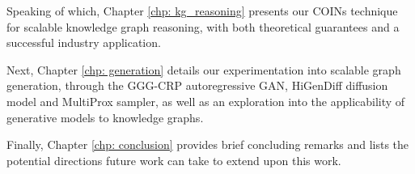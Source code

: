 Speaking of which, Chapter \ref{chp: kg_reasoning} presents our COINs technique for scalable knowledge graph reasoning, with both theoretical guarantees and a successful industry application.

Next, Chapter \ref{chp: generation} details our experimentation into scalable graph generation, through the GGG-CRP autoregressive GAN, HiGenDiff diffusion model and MultiProx sampler, as well as an exploration into the applicability of generative models to knowledge graphs. 

Finally, Chapter \ref{chp: conclusion} provides brief concluding remarks and lists the potential directions future work can take to extend upon this work.